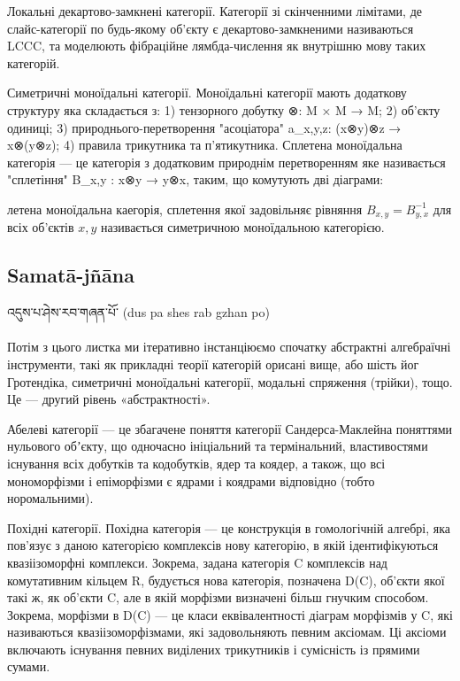 Локальні декартово-замкнені категорії. Категорії зі скінченними лімітами, де слайс-категорії по будь-якому об'єкту є декартово-замкненими називаються LCCC, та моделюють фібраційне лямбда-числення як внутрішню мову таких категорій.

Симетричні моноїдальні категорії. Моноїдальні категорії мають додаткову структуру яка складається з: 1) тензорного добутку ⊗: M × M → M; 2) об'єкту одиниці; 3) природнього-перетворення "асоціатора" a_{x,y,z}: (x⊗y)⊗z → x⊗(y⊗z); 4) правила трикутника та п'ятикутника. Сплетена моноїдальна категорія --- це категорія з додатковим природнім перетворенням яке називається "сплетіння" B_{x,y} : x⊗y → y⊗x, таким, що комутують дві діаграми:

летена моноїдальна каегорія, сплетення якої задовільняє рівняння $B_{x,y} = B^{-1}_{y,x}$ для всіх об'єктів $x,y$ називається симетричною моноїдальною категорією. 

\subsection*{Samatā-jñāna}

\ti འདུས་པ་ཤེས་རབ་གཞན་པོ་ \ua (dus pa shes rab gzhan po)\\
\\
Потім з цього листка ми ітеративно інстанціюємо спочатку абстрактні алгебраїчні інструменти, такі як прикладні теорії категорій орисані вище, або шість йог Гротендіка, симетричні моноїдальні категорії, модальні спряження (трійки), тощо. Це — другий рівень «абстрактності».

Абелеві категорії — це збагачене поняття категорії Сандерса-Маклейна поняттями нульового обʼєкту, що одночасно ініціальний та термінальний, властивостями існування всіх добутків та кодобутків, ядер та коядер, а також, що всі мономорфізми і епіморфізми є ядрами і коядрами відповідно (тобто норомальними).

Похідні категорії. Похідна категорія — це конструкція в гомологічній алгебрі, яка пов'язує з даною категорією комплексів нову категорію, в якій ідентифікуються квазіізоморфні комплекси. Зокрема, задана категорія C комплексів над комутативним кільцем R, будується нова категорія, позначена D(C), об'єкти якої такі ж, як об'єкти C, але в якій морфізми визначені більш гнучким способом. Зокрема, морфізми в D(C) — це класи еквівалентності діаграм морфізмів у C, які називаються квазіізоморфізмами, які задовольняють певним аксіомам. Ці аксіоми включають існування певних виділених трикутників і сумісність із прямими сумами.


